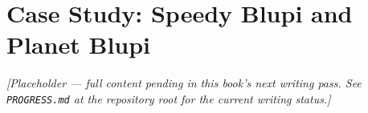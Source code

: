 \chapter{Case Study: Speedy Blupi and Planet Blupi}
\label{ch:blupi-case-study}

\emph{[Placeholder --- full content pending in this book's next writing pass. See \texttt{PROGRESS.md} at the repository root for the current writing status.]}
